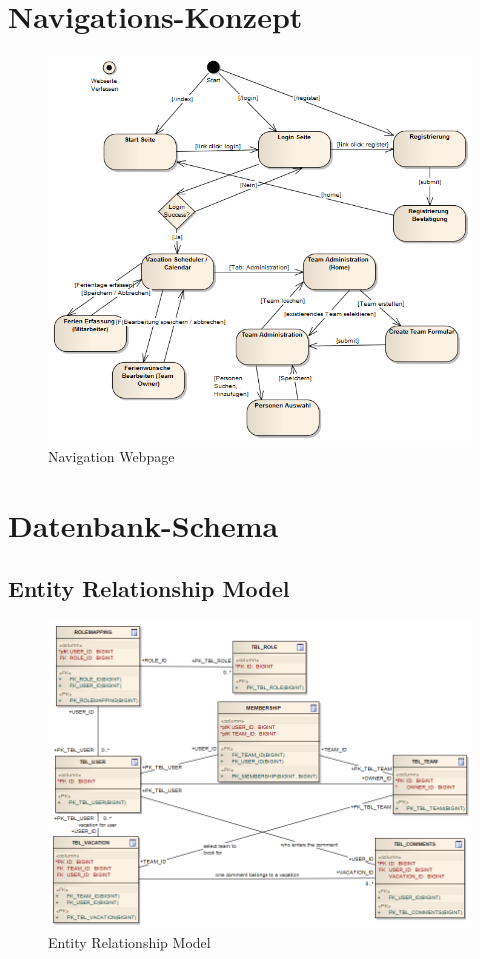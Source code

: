 \section{Navigations-Konzept}\label{konzept:navigation}
 \begin{figure}[H]
  	\centering
    	\includegraphics[width=13cm]{images/navigation_process}
 	\caption{Navigation Webpage}
\end{figure}

\section{Datenbank-Schema}\label{design:erm}

\subsection{Entity Relationship Model}
\begin{landscape}
 \begin{figure}
  	\centering
    	\includegraphics[width=19cm]{images/erm}
        	\caption{Entity Relationship Model}
\end{figure}
\end{landscape}
